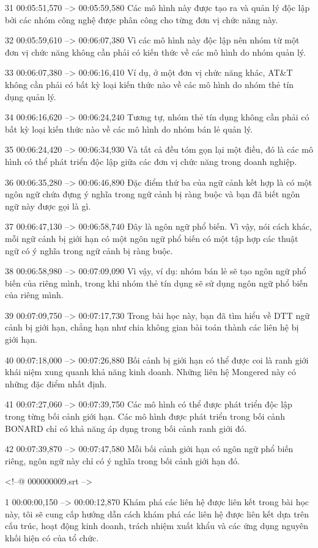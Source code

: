 31
00:05:51,570 --> 00:05:59,580
Các mô hình này được tạo ra và quản lý độc lập bởi các nhóm công nghệ được phân công cho từng đơn vị chức năng này.

32
00:05:59,610 --> 00:06:07,380
Vì các mô hình này độc lập nên nhóm từ một đơn vị chức năng không cần phải có kiến ​​thức về các mô hình do nhóm quản lý.

33
00:06:07,380 --> 00:06:16,410
Ví dụ, ở một đơn vị chức năng khác, AT&T không cần phải có bất kỳ loại kiến ​​thức nào về các mô hình do nhóm thẻ tín dụng quản lý.

34
00:06:16,620 --> 00:06:24,240
Tương tự, nhóm thẻ tín dụng không cần phải có bất kỳ loại kiến ​​thức nào về các mô hình do nhóm bán lẻ quản lý.

35
00:06:24,420 --> 00:06:34,930
Và tất cả đều tóm gọn lại một điều, đó là các mô hình có thể phát triển độc lập giữa các đơn vị chức năng trong doanh nghiệp.

36
00:06:35,280 --> 00:06:46,890
Đặc điểm thứ ba của ngữ cảnh kết hợp là có một ngôn ngữ chứa đựng ý nghĩa trong ngữ cảnh bị ràng buộc và bạn đã biết ngôn ngữ này được gọi là gì.

37
00:06:47,130 --> 00:06:58,740
Đây là ngôn ngữ phổ biến.  Vì vậy, nói cách khác, mỗi ngữ cảnh bị giới hạn có một ngôn ngữ phổ biến có một tập hợp các thuật ngữ có ý nghĩa trong ngữ cảnh bị ràng buộc.

38
00:06:58,980 --> 00:07:09,090
Vì vậy, ví dụ: nhóm bán lẻ sẽ tạo ngôn ngữ phổ biến của riêng mình, trong khi nhóm thẻ tín dụng sẽ sử dụng ngôn ngữ phổ biến của riêng mình.

39
00:07:09,750 --> 00:07:17,730
Trong bài học này, bạn đã tìm hiểu về DTT ngữ cảnh bị giới hạn, chẳng hạn như chia không gian bài toán thành các liên hệ bị giới hạn.

40
00:07:18,000 --> 00:07:26,880
Bối cảnh bị giới hạn có thể được coi là ranh giới khái niệm xung quanh khả năng kinh doanh.  Những liên hệ Mongered này có những đặc điểm nhất định.

41
00:07:27,060 --> 00:07:39,750
Các mô hình có thể được phát triển độc lập trong từng bối cảnh giới hạn.  Các mô hình được phát triển trong bối cảnh BONARD chỉ có khả năng áp dụng trong bối cảnh ranh giới đó.

42
00:07:39,870 --> 00:07:47,580
Mỗi bối cảnh giới hạn có ngôn ngữ phổ biến riêng, ngôn ngữ này chỉ có ý nghĩa trong bối cảnh giới hạn đó.

<!--@ 000000009.srt -->

1
00:00:00,150 --> 00:00:12,870
Khám phá các liên hệ được liên kết trong bài học này, tôi sẽ cung cấp hướng dẫn cách khám phá các liên hệ được liên kết dựa trên cấu trúc, hoạt động kinh doanh, trách nhiệm xuất khẩu và các ứng dụng nguyên khối hiện có của tổ chức.

